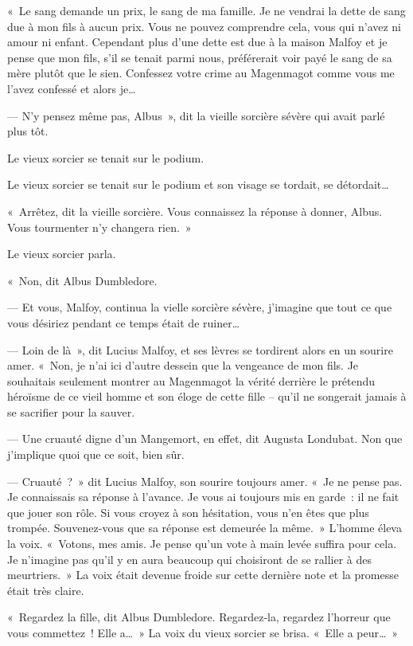 «~Le sang demande un prix, le sang de ma famille.
Je ne vendrai la dette de sang due à mon fils à aucun prix.
Vous ne pouvez comprendre cela, vous qui n'avez ni amour ni enfant.
Cependant plus d'une dette est due à la maison Malfoy et je pense que mon fils, s'il se tenait parmi nous, préférerait voir payé le sang de sa mère plutôt que le sien.
Confessez votre crime au Magenmagot comme vous me l'avez confessé et alors je…

--- N'y pensez même pas, Albus~», dit la vieille sorcière sévère qui avait parlé plus tôt.

Le vieux sorcier se tenait sur le podium.

Le vieux sorcier se tenait sur le podium et son visage se tordait, se détordait…

«~Arrêtez, dit la vieille sorcière.
Vous connaissez la réponse à donner, Albus.
Vous tourmenter n'y changera rien.~»

Le vieux sorcier parla.

«~Non, dit Albus Dumbledore.

--- Et vous, Malfoy, continua la vielle sorcière sévère, j'imagine que tout ce que vous désiriez pendant ce temps était de ruiner…

--- Loin de là~», dit Lucius Malfoy, et ses lèvres se tordirent alors en un sourire amer.
«~Non, je n'ai ici d'autre dessein que la vengeance de mon fils.
Je souhaitais seulement montrer au Magenmagot la vérité derrière le prétendu héroïsme de ce vieil homme et son éloge de cette fille -- qu'il ne songerait jamais à se sacrifier pour la sauver.

--- Une cruauté digne d'un Mangemort, en effet, dit Augusta Londubat.
Non que j'implique quoi que ce soit, bien sûr.

--- Cruauté~?~»
dit Lucius Malfoy, son sourire toujours amer.
«~Je ne pense pas.
Je connaissais sa réponse à l'avance.
Je vous ai toujours mis en garde~: il ne fait que jouer son rôle.
Si vous croyez à son hésitation, vous n'en êtes que plus trompée.
Souvenez-vous que sa réponse est demeurée la même.~»
L'homme éleva la voix.
«~Votons, mes amis.
Je pense qu'un vote à main levée suffira pour cela.
Je n'imagine pas qu'il y en aura beaucoup qui choisiront de se rallier à des meurtriers.~»
La voix était devenue froide sur cette dernière note et la promesse était très claire.

«~Regardez la fille, dit Albus Dumbledore.
Regardez-la, regardez l'horreur que vous commettez~!
Elle a…~» La voix du vieux sorcier se brisa.
«~Elle a peur…~»

